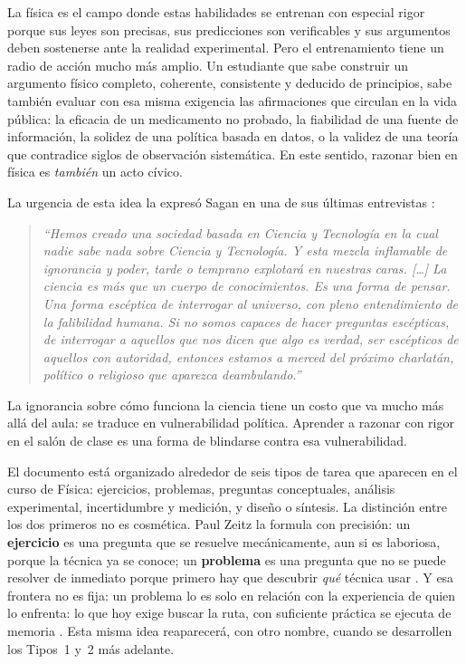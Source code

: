 \documentclass[11pt]{book}
\begin{document}
La física es el campo donde estas habilidades se entrenan con especial rigor porque sus leyes son precisas, sus predicciones son verificables y sus argumentos deben sostenerse ante la realidad experimental. Pero el entrenamiento tiene un radio de acción mucho más amplio. Un estudiante que sabe construir un argumento físico completo, coherente, consistente y deducido de principios, sabe también evaluar con esa misma exigencia las afirmaciones que circulan en la vida pública: la eficacia de un medicamento no probado, la fiabilidad de una fuente de información, la solidez de una política basada en datos, o la validez de una teoría que contradice siglos de observación sistemática. En este sentido, razonar bien en física es {\it también} un acto cívico.

La urgencia de esta idea la expresó Sagan en una de sus últimas entrevistas \cite{Sagan1996video}:

\begin{quote}
{\small\it
``Hemos creado una sociedad basada en Ciencia y Tecnología en la cual nadie sabe nada sobre Ciencia y Tecnología. Y esta mezcla inflamable de ignorancia y poder, tarde o temprano explotará en nuestras caras. [\ldots] La ciencia es más que un cuerpo de conocimientos. Es una forma de pensar. Una forma escéptica de interrogar al universo, con pleno entendimiento de la falibilidad humana. Si no somos capaces de hacer preguntas escépticas, de interrogar a aquellos que nos dicen que algo es verdad, ser escépticos de aquellos con autoridad, entonces estamos a merced del próximo charlatán, político o religioso que aparezca deambulando.''}
\end{quote}

\noindent La ignorancia sobre cómo funciona la ciencia tiene un costo que va mucho más allá del aula: se traduce en vulnerabilidad política. Aprender a razonar con rigor en el salón de clase es una forma de blindarse contra esa vulnerabilidad.

\medskip
{}

\medskip
El documento está organizado alrededor de seis tipos de tarea que aparecen en el curso de Física: ejercicios, problemas, preguntas conceptuales, análisis experimental, incertidumbre y medición, y diseño o síntesis. La distinción entre los dos primeros no es cosmética. Paul Zeitz la formula con precisión: un {\bf ejercicio} es una pregunta que se resuelve mecánicamente, aun si es laboriosa, porque la técnica ya se conoce; un {\bf problema} es una pregunta que no se puede resolver de inmediato porque primero hay que descubrir {\it qué} técnica usar \cite{Zeitz2006}. Y esa frontera no es fija: un problema lo es solo en relación con la experiencia de quien lo enfrenta: lo que hoy exige buscar la ruta, con suficiente práctica se ejecuta de memoria \cite{Zeitz2006}. Esta misma idea reaparecerá, con otro nombre, cuando se desarrollen los Tipos~1 y~2 más adelante.
\end{document}
